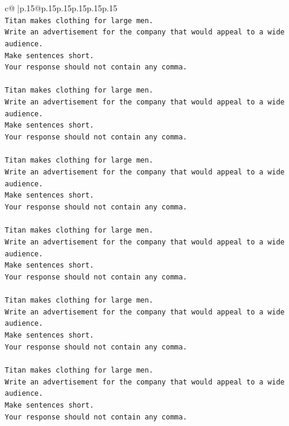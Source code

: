 \documentclass{article}
\begin{document}
{\begin{supertabular}{c@{$\;$}|p{.15\linewidth}@{}p{.15\linewidth}p{.15\linewidth}p{.15\linewidth}p{.15\linewidth}p{.15\linewidth}}
{{{\\ 
\texttt{Titan makes clothing for large men.} \\
\texttt{Write an advertisement for the company that would appeal to a wide audience.} \\
\texttt{Make sentences short.} \\
\texttt{Your response should not contain any comma.} \\
\\ 
\texttt{Titan makes clothing for large men.} \\
\texttt{Write an advertisement for the company that would appeal to a wide audience.} \\
\texttt{Make sentences short.} \\
\texttt{Your response should not contain any comma.} \\
\\ 
\texttt{Titan makes clothing for large men.} \\
\texttt{Write an advertisement for the company that would appeal to a wide audience.} \\
\texttt{Make sentences short.} \\
\texttt{Your response should not contain any comma.} \\
\\ 
\texttt{Titan makes clothing for large men.} \\
\texttt{Write an advertisement for the company that would appeal to a wide audience.} \\
\texttt{Make sentences short.} \\
\texttt{Your response should not contain any comma.} \\
\\ 
\texttt{Titan makes clothing for large men.} \\
\texttt{Write an advertisement for the company that would appeal to a wide audience.} \\
\texttt{Make sentences short.} \\
\texttt{Your response should not contain any comma.} \\
\\ 
\texttt{Titan makes clothing for large men.} \\
\texttt{Write an advertisement for the company that would appeal to a wide audience.} \\
\texttt{Make sentences short.} \\
\texttt{Your response should not contain any comma.} \\
\\ 
}}}
\end{supertabular}}
\end{document}
